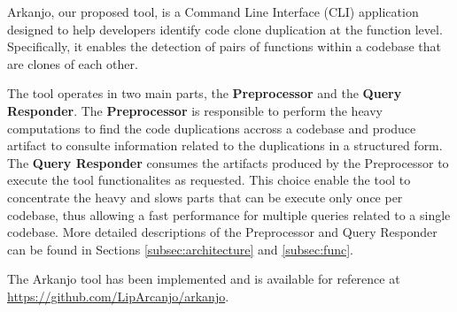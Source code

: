 \en

Arkanjo, our proposed tool, is a Command Line Interface (CLI) application designed to
help developers identify code clone duplication at the function level.
Specifically, it enables the detection of pairs of functions within a codebase
that are clones of each other.

The tool operates in two main parts, the \textbf{Preprocessor} and the \textbf{Query Responder}. 
The \textbf{Preprocessor} is responsible to perform the heavy computations to find the code duplications 
accross a codebase and produce artifact to consulte information related to the duplications in a structured form.
The \textbf{Query Responder} consumes the artifacts produced by the Preprocessor to execute the tool functionalites as requested.
This choice enable the tool to concentrate the heavy and slows parts that can be execute only once per codebase, 
thus allowing a fast performance for multiple queries related to a single codebase.
More detailed descriptions of the Preprocessor and Query Responder can be found in
Sections \ref{subsec:architecture} and \ref{subsec:func}.

The Arkanjo tool has been implemented and is available for reference at
\url{https://github.com/LipArcanjo/arkanjo}.

